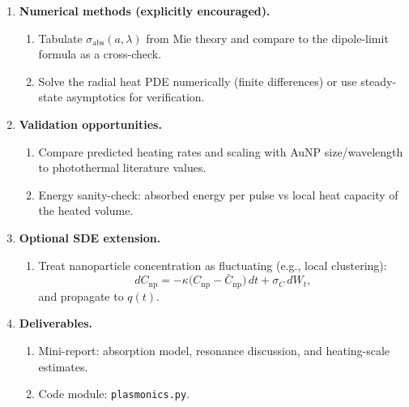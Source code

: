 \documentclass[11pt]{article}
\begin{document}
\begin{enumerate}
		\item \textbf{Numerical methods (explicitly encouraged).}
		\begin{enumerate}
			\item Tabulate $\sigma_{\mathrm{abs}}(a,\lambda)$ from Mie theory and compare to the dipole-limit formula as a cross-check.
			\item Solve the radial heat PDE numerically (finite differences) or use steady-state asymptotics for verification.
		\end{enumerate}
		
		\item \textbf{Validation opportunities.}
		\begin{enumerate}
			\item Compare predicted heating rates and scaling with AuNP size/wavelength to photothermal literature values.
			\item Energy sanity-check: absorbed energy per pulse vs local heat capacity of the heated volume.
		\end{enumerate}
		
		\item \textbf{Optional SDE extension.}
		\begin{enumerate}
			\item Treat nanoparticle concentration as fluctuating (e.g., local clustering):
			\[
			dC_{\mathrm{np}}=-\kappa\bigl(C_{\mathrm{np}}-\bar C_{\mathrm{np}}\bigr)\,dt + \sigma_C\,dW_t,
			\]
			and propagate to $q(t)$.
		\end{enumerate}
		
		\item \textbf{Deliverables.}
		\begin{enumerate}
			\item Mini-report: absorption model, resonance discussion, and heating-scale estimates.
			\item Code module: \texttt{plasmonics.py}.
		\end{enumerate}
	\end{enumerate}
	
	\newpage
	
\end{document}
